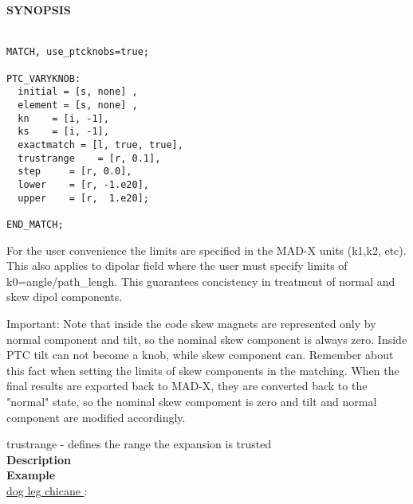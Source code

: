 \paragraph{SYNOPSIS}
\begin{verbatim}

MATCH, use_ptcknobs=true;

PTC_VARYKNOB: 
  initial = [s, none] , 
  element = [s, none] , 
  kn    = [i, -1], 
  ks    = [i, -1], 
  exactmatch = [l, true, true], 
  trustrange    = [r, 0.1],  
  step     = [r, 0.0], 
  lower    = [r, -1.e20],
  upper    = [r,  1.e20]; 

END_MATCH;
\end{verbatim}

  For the user convenience the limits are specified in the MAD-X units (k1,k2, etc). This also applies to dipolar field where the user must specify limits of k0=angle/path\_lengh.  This guarantees concistency in treatment of normal and skew dipol components.  

 Important: Note that inside the code skew magnets are represented only by  normal component and tilt, so the nominal skew component is always zero.  Inside PTC tilt can not become a knob, while skew component can.  Remember about this fact when setting the limits of skew components in the matching.  When the final results are exported back to MAD-X, they are converted back to the "normal" state, so the nominal skew compoment is zero and tilt and  normal component are modified accordingly.    

 trustrange - defines the range the expansion is trusted \\

\textbf{ Description }\\



\textbf{ Example }\\
\href{http://cern.ch/frs/mad-X_examples/ptc_madx_interface/matchknobs/.madx}{  dog leg chicane }:   




% 
% 
% 
% 


